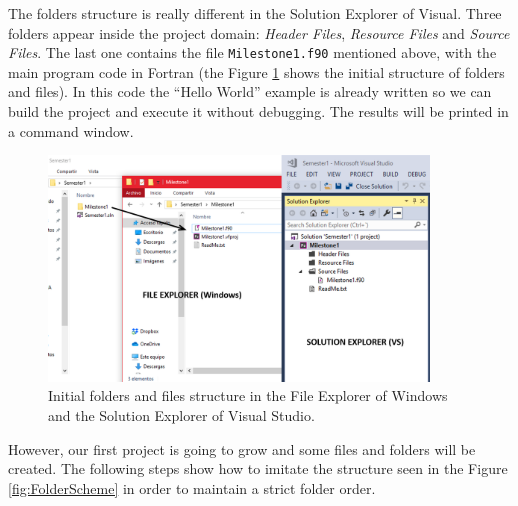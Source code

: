 The folders structure is really different in the Solution Explorer of Visual. Three folders appear inside the project domain: \textit{Header Files}, \textit{Resource Files} and \textit{Source Files}. The last one contains the file \texttt{Milestone1.f90} mentioned above, with the main program code in Fortran (the Figure \ref{fig:Intro2} shows the initial structure of folders and files). In this code the ``Hello World'' example is already written so we can build the project and execute it without debugging. The results will be printed in a command window. 

\begin{figure}
    \centering
    \includegraphics[width= 0.9\textwidth]{Figures/Intro2}
    \caption{Initial folders and files structure in the File Explorer of Windows and the Solution Explorer of Visual Studio.}
    \label{fig:Intro2}
\end{figure}

However, our first project is going to grow and some files and folders will be created. The following steps show how to imitate the structure seen in the Figure \ref{fig:FolderScheme} in order to maintain a strict folder order. 

